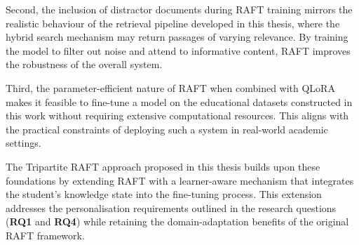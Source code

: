 Second, the inclusion of distractor documents during RAFT training mirrors the realistic behaviour of the retrieval pipeline developed in this thesis, where the hybrid search mechanism may return passages of varying relevance. By training the model to filter out noise and attend to informative content, RAFT improves the robustness of the overall system.

Third, the parameter-efficient nature of RAFT when combined with QLoRA \cite{dettmers2023qlora} makes it feasible to fine-tune a model on the educational datasets constructed in this work without requiring extensive computational resources. This aligns with the practical constraints of deploying such a system in real-world academic settings.

The Tripartite RAFT approach proposed in this thesis builds upon these foundations by extending RAFT with a learner-aware mechanism that integrates the student's knowledge state into the fine-tuning process. This extension addresses the personalisation requirements outlined in the research questions (\textbf{RQ1} and \textbf{RQ4}) while retaining the domain-adaptation benefits of the original RAFT framework.
